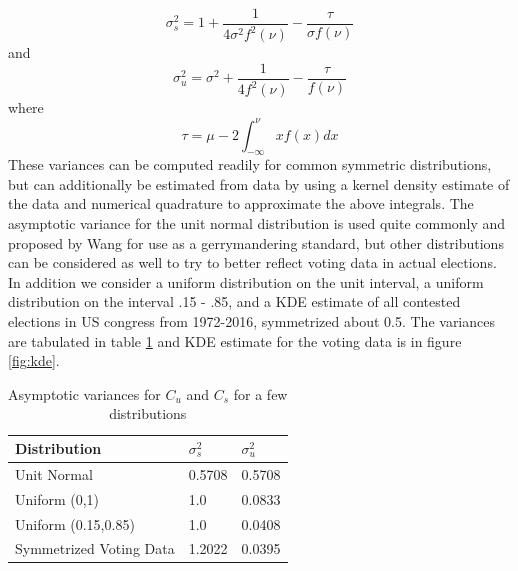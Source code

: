 \documentclass[preprint,12pt]{article}
\begin{document}
\begin{equation}
    \sigma^{2}_{s} = 1 +\frac{1}{4\sigma^{2}f^{2}\left(\nu\right)}-\frac{\tau}{\sigma f\left(\nu\right)}
\end{equation}
and
\begin{equation}
    \sigma^{2}_{u} = \sigma^{2} +\frac{1}{4f^{2}\left(\nu\right)}-\frac{\tau}{f\left(\nu\right)}
\end{equation}
where 
\begin{equation}
    \tau = \mu - 2\int_{-\infty}^{\nu} xf\left(x\right)dx
\end{equation}
These variances can be computed readily for common symmetric distributions, but can additionally be estimated from data by using a kernel density estimate of the data and numerical quadrature to approximate the above integrals.
The asymptotic variance for the unit normal distribution is used quite commonly and proposed by Wang for use as a gerrymandering standard, but other distributions can be considered as well to try to better reflect voting data in actual elections. In addition we consider a uniform distribution on the unit interval, a uniform distribution on the interval .15 - .85, and a KDE estimate of all contested elections in US congress from 1972-2016, symmetrized about 0.5.
The variances are tabulated in table \ref{tab:var} and KDE estimate for the voting data is in figure \ref{fig:kde}.

\begin{table}[htb!]
\centering
\caption{Asymptotic variances for $C_{u}$ and $C_{s}$ for a few distributions \label{tab:var}}
\begin{tabular}{|l|l|l|}
\hline
Distribution & $\sigma^{2}_{s}$ & $\sigma^{2}_{u}$\\
\hline
\hline
Unit Normal & 0.5708 & 0.5708\\
\hline
Uniform (0,1) & 1.0 & 0.0833\\
\hline
Uniform (0.15,0.85) & 1.0 & 0.0408\\
\hline
Symmetrized Voting Data & 1.2022 & 0.0395\\
\hline
\end{tabular}
\end{table}
\end{document}
